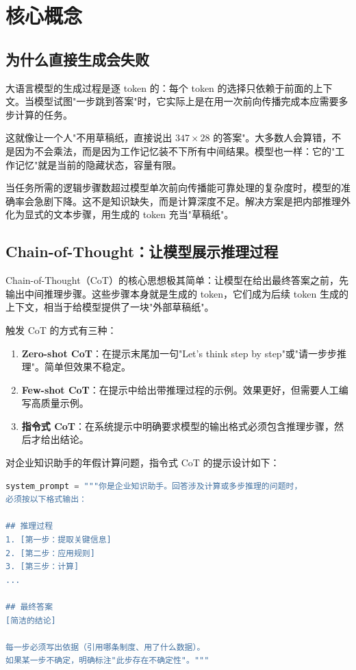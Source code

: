 \section{核心概念}

\subsection{为什么直接生成会失败}
大语言模型的生成过程是逐 token 的：每个 token 的选择只依赖于前面的上下文。当模型试图"一步跳到答案"时，它实际上是在用一次前向传播完成本应需要多步计算的任务。

这就像让一个人"不用草稿纸，直接说出 $347 \times 28$ 的答案"。大多数人会算错，不是因为不会乘法，而是因为工作记忆装不下所有中间结果。模型也一样：它的"工作记忆"就是当前的隐藏状态，容量有限。

\begin{definition}[推理深度瓶颈]
当任务所需的逻辑步骤数超过模型单次前向传播能可靠处理的复杂度时，模型的准确率会急剧下降。这不是知识缺失，而是计算深度不足。解决方案是把内部推理外化为显式的文本步骤，用生成的 token 充当"草稿纸"。
\end{definition}

\subsection{Chain-of-Thought：让模型展示推理过程}
Chain-of-Thought（CoT）的核心思想极其简单：让模型在给出最终答案之前，先输出中间推理步骤。这些步骤本身就是生成的 token，它们成为后续 token 生成的上下文，相当于给模型提供了一块"外部草稿纸"。

触发 CoT 的方式有三种：

\begin{enumerate}
  \item \textbf{Zero-shot CoT}：在提示末尾加一句"Let's think step by step"或"请一步步推理"。简单但效果不稳定。
  \item \textbf{Few-shot CoT}：在提示中给出带推理过程的示例。效果更好，但需要人工编写高质量示例。
  \item \textbf{指令式 CoT}：在系统提示中明确要求模型的输出格式必须包含推理步骤，然后才给出结论。
\end{enumerate}

对企业知识助手的年假计算问题，指令式 CoT 的提示设计如下：

\begin{lstlisting}[language=Python]
system_prompt = """你是企业知识助手。回答涉及计算或多步推理的问题时，
必须按以下格式输出：

## 推理过程
1. [第一步：提取关键信息]
2. [第二步：应用规则]
3. [第三步：计算]
...

## 最终答案
[简洁的结论]

每一步必须写出依据（引用哪条制度、用了什么数据）。
如果某一步不确定，明确标注"此步存在不确定性"。"""
\end{lstlisting}

